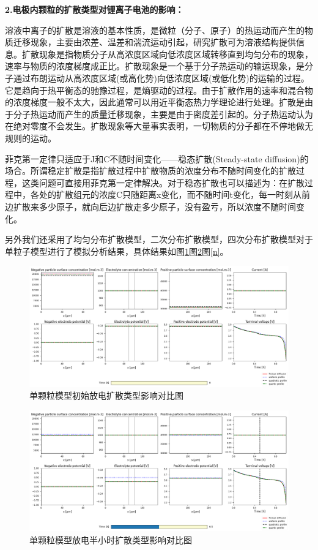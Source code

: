 \documentclass[12pt]{ctexart}%
\begin{document}
\noindent\textbf{2.电极内颗粒的扩散类型对锂离子电池的影响：}

溶液中离子的扩散是溶液的基本性质，是微粒（分子、原子）的热运动而产生的物质迁移现象，主要由浓差、温差和湍流运动引起，研究扩散可为溶液结构提供信息。扩散现象是指物质分子从高浓度区域向低浓度区域转移直到均匀分布的现象，速率与物质的浓度梯度成正比。扩散现象是一个基于分子热运动的输运现象，是分子通过布朗运动从高浓度区域(或高化势)向低浓度区域(或低化势)的运输的过程。它是趋向于热平衡态的驰豫过程，是熵驱动的过程。由于扩散作用的速率和混合物的浓度梯度一般不太大，因此通常可以用近平衡态热力学理论进行处理。扩散是由于分子热运动而产生的质量迁移现象，主要是由于密度差引起的。分子热运动认为在绝对零度不会发生。扩散现象等大量事实表明，一切物质的分子都在不停地做无规则的运动。

菲克第一定律只适应于J和C不随时间变化——稳态扩散(Steady-state diffusion)的场合。所谓稳定扩散是指扩散过程中扩散物质的浓度分布不随时间变化的扩散过程，这类问题可直接用菲克第一定律解决。对于稳态扩散也可以描述为：在扩散过程中，各处的扩散组元的浓度C只随距离x变化，而不随时间t变化，每一时刻从前边扩散来多少原子，就向后边扩散走多少原子，没有盈亏，所以浓度不随时间变化。

另外我们还采用了均匀分布扩散模型，二次分布扩散模型，四次分布扩散模型对于单粒子模型进行了模拟分析结果，具体结果如图\ref{l}图\ref{m}图\ref{n}。
\begin{figure}[h]
	\centering
	\includegraphics[scale = 0.4]{K0}
	\caption{单颗粒模型初始放电扩散类型影响对比图}
	\label{l}
\end{figure}

\begin{figure}[H]
	\centering
	\includegraphics[scale = 0.4]{K1}
	\caption{单颗粒模型放电半小时扩散类型影响对比图}
	\label{m}
\end{figure}
\end{document}

